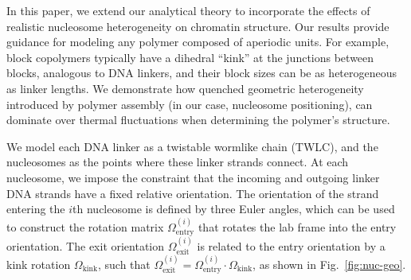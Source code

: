 \documentclass[%
 reprint,
superscriptaddress,
showpacs,preprintnumbers,
 amsmath,amssymb,
 aps,
 prl,
]{revtex4-1}
\begin{document}
In this paper, we extend our analytical theory to incorporate the effects of realistic
    nucleosome heterogeneity on chromatin structure.
Our results provide guidance for modeling any polymer composed of aperiodic units.
For example, block copolymers typically have a dihedral ``kink'' at the junctions between
    blocks, analogous to DNA linkers, and their block sizes can be as heterogeneous as linker
    lengths.
We demonstrate how quenched geometric heterogeneity introduced by polymer assembly (in our case,
    nucleosome positioning), can dominate over thermal fluctuations when determining the polymer's structure.



We model each DNA linker as a twistable wormlike chain (TWLC), and the nucleosomes as the
    points where these linker strands connect.
At each nucleosome, we impose the constraint that the incoming and outgoing
    linker DNA strands have a fixed relative orientation.
The orientation of the strand entering the $i$th nucleosome is defined by three
    Euler angles, which can be used to construct the rotation matrix
    $\Omega^{(i)}_\text{entry}$ that rotates the lab frame into the entry
    orientation.
The exit orientation $\Omega^{(i)}_\text{exit}$ is related to the entry orientation
    by a kink rotation $\Omega_\text{kink}$, such that $\Omega^{(i)}_\text{exit}
    = \Omega^{(i)}_\text{entry} \cdot \Omega_\text{kink}$, as shown in
    Fig.~\ref{fig:nuc-geo}.
\end{document}

